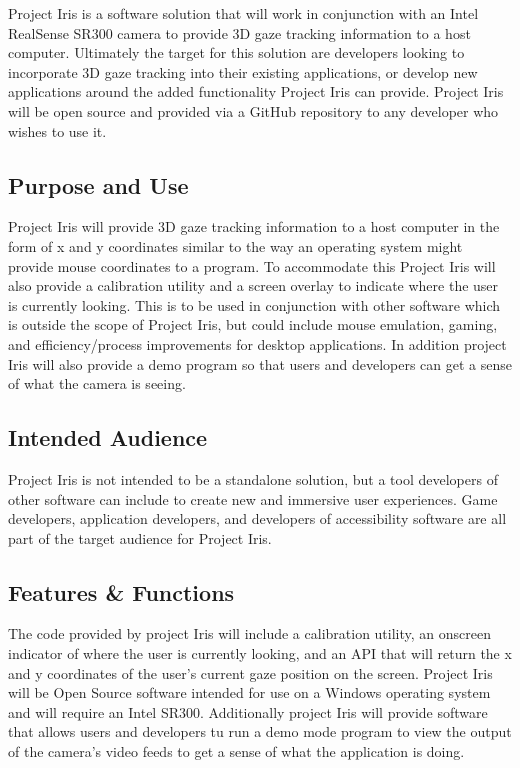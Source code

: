 Project Iris is a software solution that will work in conjunction with an Intel RealSense SR300 camera to provide 3D gaze tracking information to a host computer. Ultimately the target for this solution are developers looking to incorporate 3D gaze tracking into their existing applications, or develop new applications around the added functionality Project Iris can provide. Project Iris will be open source and provided via a GitHub repository to any developer who wishes to use it.

\subsection{Purpose and Use}
Project Iris will provide 3D gaze tracking information to a host computer in the form of x and y coordinates similar to the way an operating system might provide mouse coordinates to a program. To accommodate this Project Iris will also provide a calibration utility and a screen overlay to indicate where the user is currently looking. This is to be used in conjunction with other software which is outside the scope of Project Iris, but could include mouse emulation, gaming, and efficiency/process improvements for desktop applications. In addition project Iris will also provide a demo program so that users and developers can get a sense of what the camera is seeing.

\subsection{Intended Audience}
Project Iris is not intended to be a standalone solution, but a tool developers of other software can include to create new and immersive user experiences. Game developers, application developers, and developers of accessibility software are all part of the target audience for Project Iris.

\subsection{Features \& Functions}
The code provided by project Iris will include a calibration utility, an onscreen indicator of where the user is currently looking, and an API that will return the x and y coordinates of the user's current gaze position on the screen. Project Iris will be Open Source software intended for use on a Windows operating system and will require an Intel SR300. Additionally project Iris will provide software that allows users and developers tu run a demo mode program to view the output of the camera's video feeds to get a sense of what the application is doing. 

